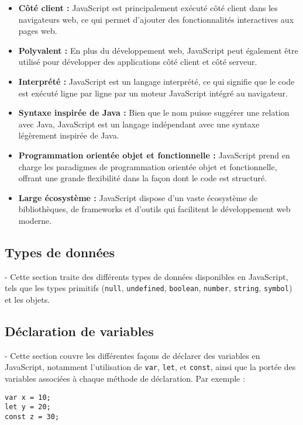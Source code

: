 \documentclass{article}
\begin{document}
\begin{itemize}
    \item \textbf{Côté client :} JavaScript est principalement exécuté côté client dans les navigateurs web, ce qui permet d'ajouter des fonctionnalités interactives aux pages web.
    \item \textbf{Polyvalent :} En plus du développement web, JavaScript peut également être utilisé pour développer des applications côté client et côté serveur.
    \item \textbf{Interprété :} JavaScript est un langage interprété, ce qui signifie que le code est exécuté ligne par ligne par un moteur JavaScript intégré au navigateur.
    \item \textbf{Syntaxe inspirée de Java :} Bien que le nom puisse suggérer une relation avec Java, JavaScript est un langage indépendant avec une syntaxe légèrement inspirée de Java.
    \item \textbf{Programmation orientée objet et fonctionnelle :} JavaScript prend en charge les paradigmes de programmation orientée objet et fonctionnelle, offrant une grande flexibilité dans la façon dont le code est structuré.
    \item \textbf{Large écosystème :} JavaScript dispose d'un vaste écosystème de bibliothèques, de frameworks et d'outils qui facilitent le développement web moderne.
\end{itemize}



\subsection{Types de données}
- Cette section traite des différents types de données disponibles en JavaScript, tels que les types primitifs (\texttt{null}, \texttt{undefined}, \texttt{boolean}, \texttt{number}, \texttt{string}, \texttt{symbol}) et les objets.

\subsection{Déclaration de variables}
- Cette section couvre les différentes façons de déclarer des variables en JavaScript, notamment l'utilisation de \texttt{var}, \texttt{let}, et \texttt{const}, ainsi que la portée des variables associées à chaque méthode de déclaration. Par exemple :
\begin{verbatim}
var x = 10;
let y = 20;
const z = 30;
\end{verbatim}
\end{document}
